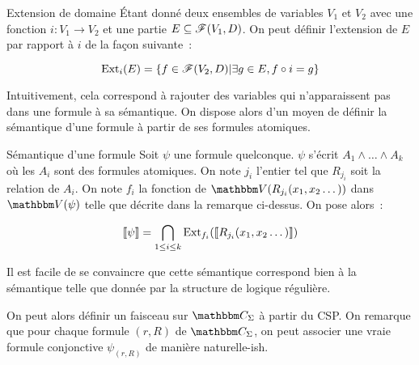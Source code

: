 \begin{defi}{Extension de domaine}
    Étant donné deux ensembles de variables $V_1$ et $V_2$ avec une fonction
    $i : V_1 \rightarrow V_2$ et une partie $E\subseteq\mathscr{F}(V_1, D)$. On peut définir
    l'extension de $E$ par rapport à $i$ de la façon suivante~:

    \[ \text{Ext}_i(E) = \{f\in\mathscr{F}(V_2,D) | \exists g\in E, f\circ i = g \} \]
\end{defi}

Intuitivement, cela correspond à rajouter des variables qui n'apparaissent pas dans une
formule à sa sémantique. On dispose alors d'un moyen de définir la sémantique d'une
formule à partir de ses formules atomiques.

\begin{defi}{Sémantique d'une formule}
    Soit $\psi$ une formule quelconque. $\psi$ s'écrit $A_1\wedge \dots \wedge A_k$ où
    les $A_i$ sont des formules atomiques. On note $j_i$ l'entier tel que $R_{j_i}$ soit
    la relation de $A_i$. On note $f_i$ la fonction de $\V(R_{j_i}(x_1, x_2 \dots))$
    dans $\V(\psi)$ telle que décrite dans la remarque ci-dessus. On pose alors~:

    \[ \llbracket {\psi} \rrbracket = \bigcap_{1\leq i\leq k} \text{Ext}_{f_i}(\llbracket {R_{j_i}(x_1, x_2\dots)} \rrbracket) \]

    Il est facile de se convaincre que cette sémantique correspond bien à la sémantique
    telle que donnée par la structure de logique régulière.
\end{defi}

On peut alors définir un faisceau sur $\C_\Sigma$ à partir du CSP. On remarque que pour 
chaque formule $(r,R)$ de $\C_\Sigma$, on peut associer une vraie formule conjonctive
$\psi_{(r,R)}$ de manière naturelle-ish. %

